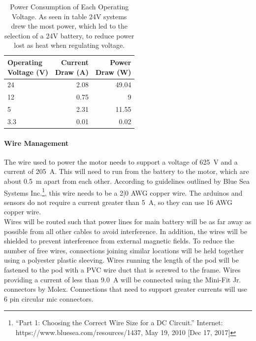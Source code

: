 \documentclass[main.tex]{subfiles}
\begin{document}
 \begin{table}[H]
        \centering
        \begin{tabular}{@{}lrr@{}} \toprule
            \makecell{Operating \\ Voltage (V)} & \makecell{Current \\ Draw (A)}  &  \makecell{Power \\ Draw (W)} \\ \midrule
            24 & 2.08 & 49.04 \\
            12 & 0.75 & 9 \\
            5 & 2.31 & 11.55 \\
            3.3 & 0.01 & 0.02 \\
        \end{tabular}
        \caption{Power Consumption of Each Operating Voltage. As seen in table 24V systems drew the most power, which led to the selection of a 24V battery, to reduce power lost as heat when regulating voltage.}
    \end{table}
    \paragraph{Wire Management}
    The wire used to power the motor needs to support a voltage of \SI{625}{V} and a current of \SI{205}{A}. This will need to run from the battery to the motor, which are about \SI{0.5}{m} apart from each other. According to guidelines outlined by Blue Sea Systems Inc.\footnote{“Part 1: Choosing the Correct Wire Size for a DC Circuit.” Internet: https://www.bluesea.com/resources/1437, May 19, 2010 [Dec 17, 2017]}, this wire needs to be a 2|0 AWG copper wire. The arduinos and sensors do not require a current greater than \SI{5}{A}, so they can use 16 AWG copper wire.\\

    Wires will be routed such that power lines for main battery will be as far away as possible from all other cables to avoid interference. In addition, the wires will be shielded to prevent interference from external magnetic fields. To reduce the number of free wires, connections joining similar locations will be held together using a polyester plastic sleeving. Wires running the length of the pod will be fastened to the pod with a PVC wire duct that is screwed to the frame. Wires providing a current of less than \SI{9.0}{A} will be connected using the Mini-Fit Jr. connectors by Molex.  Connections that need to support greater currents will use 6 pin circular mic connectors.
\end{document}
